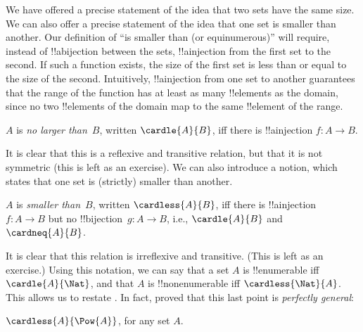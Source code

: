 \documentclass[../../../include/open-logic-section]{subfiles}
\begin{document}


\begin{explain}
We have offered a precise statement of the idea that two sets have the
same size. We can also offer a precise statement of the idea that one
set is smaller than another. Our definition of ``is smaller than (or
equinumerous)'' will require, instead of !!a{bijection} between the
sets, !!a{injection} from the first set to the second. If such a
function exists, the size of the first set is less than or equal to
the size of the second. Intuitively, !!a{injection} from one set to
another guarantees that the range of the function has at least as many
!!{element}s as the domain, since no two !!{element}s of the domain
map to the same !!{element} of the range.
\end{explain}

\begin{defn}
$A$ is \emph{no larger than}~$B$, written $\cardle{A}{B}$, iff there
is !!a{injection} $f \colon A \to B$.
\end{defn}

It is clear that this is a reflexive and transitive relation, but that
it is not symmetric (this is left as an exercise). We can also
introduce a notion, which states that one set is (strictly) smaller
than another. 

\begin{defn}
$A$ is \emph{smaller than}~$B$, written $\cardless{A}{B}$, iff there
is !!a{injection}~$f\colon A \to B$ but no !!{bijection}~$g\colon A
\to B$, i.e., $\cardle{A}{B}$ and $\cardneq{A}{B}$.
\end{defn}

It is clear that this relation is irreflexive
and transitive. (This is left as an exercise.) Using this notation, we
can say that a set $A$ is !!{enumerable} iff $\cardle{A}{\Nat}$, and
that $A$ is !!{nonenumerable} iff $\cardless{\Nat}{A}$. This allows us
to restate
. In fact,
\citet{Cantor1892} proved that this last point is \emph{perfectly
general}:

\begin{thm}[Cantor]
$\cardless{A}{\Pow{A}}$, for any set $A$.
\end{thm}
\end{document}

